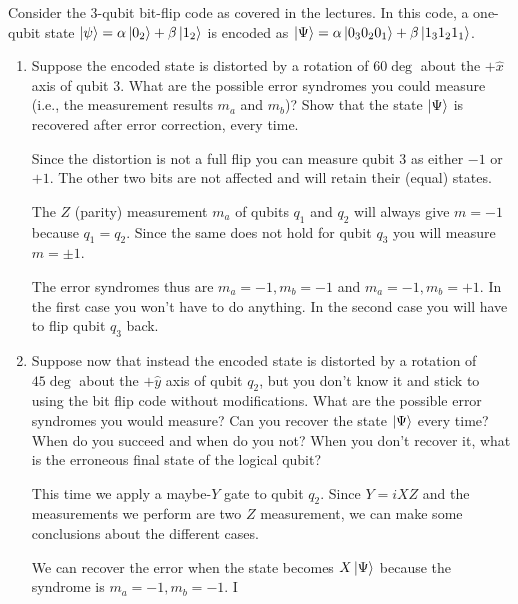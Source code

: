 \documentclass[12pt]{article}
\newenvironment{answer}{\begingroup\setlength{\leftskip}{-\leftmargin}\begin{framed}}{\end{framed}\endgroup}
\begin{document}
Consider the 3-qubit bit-flip code as covered in the lectures. In this code, a one-qubit state $\ket{\psi} = \alpha\ket{0_2} + \beta\ket{1_2}$ is encoded as $\ket{\Psi} = \alpha\ket{0_30_20_1} + \beta\ket{1_31_21_1}$.

\begin{enumerate}
	\item Suppose the encoded state is distorted by a rotation of $60\deg$ about the $+\hat{x}$ axis of qubit 3. What are the possible error syndromes you could measure (i.e., the measurement results $m_a$ and $m_b$)? Show that the state $\ket{\Psi}$ is recovered after error correction, every time.

	\begin{answer}
		Since the distortion is not a full flip you can measure qubit 3 as either $-1$ or $+1$. The other two bits are not affected and will retain their (equal) states.

		The $Z$ (parity) measurement $m_a$ of qubits $q_1$ and $q_2$ will always give $m = -1$ because $q_1 = q_2$. Since the same does not hold for qubit $q_3$ you will measure $m = \pm1$.

		The error syndromes thus are $m_a = -1, m_b = -1$ and $m_a = -1, m_b = +1$. In the first case you won't have to do anything. In the second case you will have to flip qubit $q_3$ back.
	\end{answer}

	\item Suppose now that instead the encoded state is distorted by a rotation of $45\deg$ about the $+\hat{y}$ axis of qubit $q_2$, but you don't know it and stick to using the bit flip code without modifications. What are the possible error syndromes you would measure? Can you recover the state $\ket{\Psi}$ every time? When do you succeed and when do you not? When you don't recover it, what is the erroneous final state of the logical qubit?

	\begin{answer}
		This time we apply a maybe-$Y$ gate to qubit $q_2$. Since $Y = iXZ$ and the measurements we perform are two $Z$ measurement, we can make some conclusions about the different cases.

		We can recover the error when the state becomes $X\ket{\Psi}$ because the syndrome is $m_a = -1, m_b = -1$. I
	\end{answer}

\end{enumerate}
\end{document}
